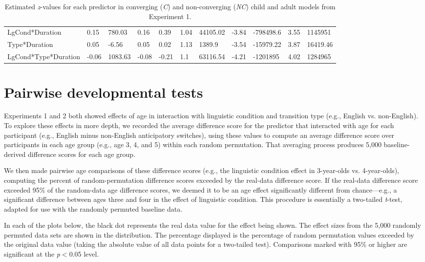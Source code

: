 \documentclass[authoryear, 12pt]{elsarticle}
\begin{document}
\begin{table}
\begin{scriptsize}
\begin{tabular}{lllllllllll}
    LgCond*Duration			& 0.15	& 780.03	& 0.16	& 0.39	& 1.04	& 44105.02	& -3.84	& -798498.6	& 3.55	& 1145951	\\
    Type*Duration 				& 0.05	& -6.56		& 0.05	& 0.02	& 1.13	& 1389.9	& -3.54	& -15979.22	& 3.87	& 16419.46	\\
    LgCond*Type*Duration	& -0.06	& 1083.63	& -0.08	& -0.21	& 1.1		& 63116.54	& -4.21	& -1201895		& 4.02	& 1284965	\\
    \hline
  \end{tabular}
  \caption{Estimated \textit{z}-values for each predictor in converging (\textit{C}) and non-converging (\textit{NC}) child and adult models from Experiment 1. }
\label{tab:nonconv_e1}
 \end{scriptsize}
\end{table}
\linespread{2}

\section{Pairwise developmental tests}
\label{sec:pairwisedev}
\setcounter{figure}{0}
Experiments 1 and 2 both showed effects of age in interaction with linguistic condition and transition type (e.g., English vs. non-English). To explore these effects in more depth, we recorded the average difference score for the predictor that interacted with age for each participant (e.g., English minus non-English anticipatory switches), using these values to compute an average difference score over participants in each age group (e.g., age 3, 4, and 5) within each random permutation. That averaging process produces 5,000 baseline-derived difference scores for each age group.

We then made pairwise age comparisons of these difference scores (e.g., the linguistic condition effect in 3-year-olds vs. 4-year-olds), computing the percent of random-permutation difference scores exceeded by the real-data difference score. If the real-data difference score exceeded 95\% of the random-data age difference scores, we deemed it to be an age effect significantly different from chance---e.g., a significant difference between ages three and four in the effect of linguistic condition. This procedure is essentially a two-tailed \textit{t}-test, adapted for use with the randomly permuted baseline data.

In each of the plots below, the black dot represents the real data value for the effect being shown. The effect sizes from the 5,000 randomly permuted data sets are shown in the distribution. The percentage displayed is the percentage of random permutation values exceeded by the original data value (taking the absolute value of all data points for a two-tailed test). Comparisons marked with 95\% or higher are significant at the \textit{p}$<$0.05 level. 
\end{document}
